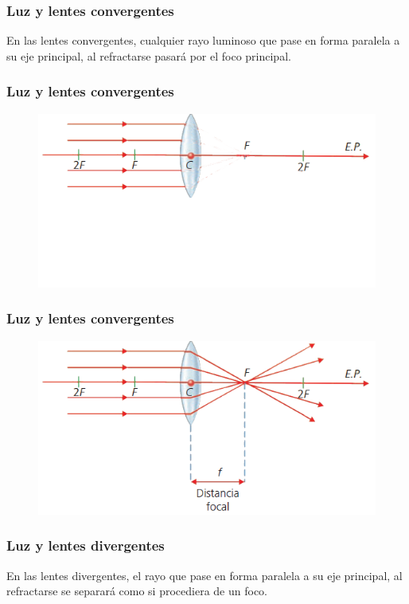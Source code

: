 \documentclass[14pt]{beamer}
\begin{document}
\begin{frame}
\frametitle{Luz y lentes convergentes}
En las lentes convergentes, cualquier rayo luminoso que pase en forma paralela a su eje principal, al refractarse pasará por el foco principal.
\end{frame}
\begin{frame}
\frametitle{Luz y lentes convergentes}
\begin{figure}
    \centering
    \includegraphics[scale=0.8]{Imagenes/Lentes_convergentes_02_02.png}
\end{figure}
\end{frame}
\begin{frame}
\frametitle{Luz y lentes convergentes}
\begin{figure}
    \centering
    \includegraphics[scale=0.8]{Imagenes/Lentes_convergentes_02.png}
\end{figure}
\end{frame}
\begin{frame}
\frametitle{Luz y lentes divergentes}
En las lentes divergentes, el rayo que pase en forma paralela a su eje principal, al refractarse se separará como si procediera de un foco.
\end{frame}
\end{document}
